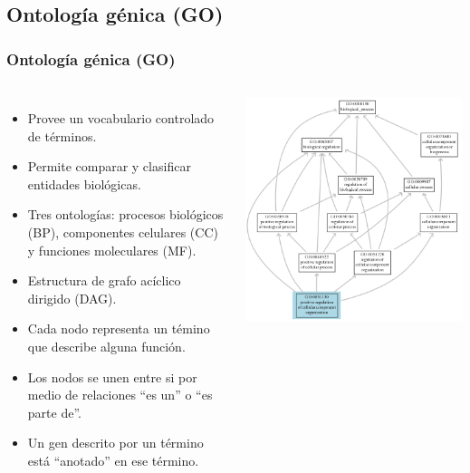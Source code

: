 \documentclass[serif,9pt, t]{beamer}
\begin{document}
\subsection{Ontología génica (GO)}
\begin{frame}\frametitle{Ontología génica (GO)}
\begin{columns}[T]
	\begin{itemize}
		\item Provee un vocabulario controlado de términos.
		\item Permite comparar y clasificar entidades biológicas.
		\item Tres ontologías: procesos biológicos (BP), componentes celulares (CC) y funciones moleculares (MF).
		\item Estructura de grafo acíclico dirigido (DAG).
		\item Cada nodo representa un témino que describe alguna función.
		\item Los nodos se unen entre si por medio de relaciones ``es un'' o ``es parte de''.
		\item Un gen descrito por un término está ``anotado'' en ese término.
	\end{itemize}
	\centering
	\includegraphics[width=1.1\textwidth]{ejemplo_de_go}	
\end{columns}
\end{frame}
\end{document}
